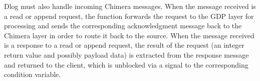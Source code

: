 Dlog must also handle incoming Chimera messages. When the message received is a read or append request, the function forwards the request to the GDP layer for processing and sends the corresponding acknowledgment message back to the Chimera layer in order to route it back to the source. When the message received is a response to a read or append request, the result of the request (an integer return value and possibly payload data) is extracted from the response message and returned to the client, which is unblocked via a signal to the corresponding condition variable.